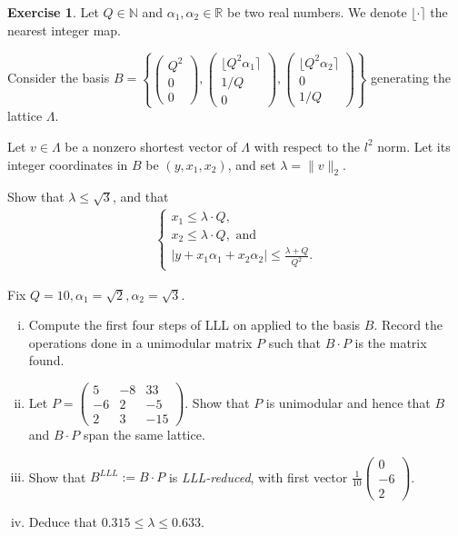 \documentclass[12pt,a4paper]{article}
\theoremstyle{plain}
\newtheorem*{Sol*}{Solution}
\theoremstyle{definition}
\newtheorem{Ex}{Exercise}
\def \N {\mathbb N}
\def \R {\mathbb R}
\newcommand{\nint}[1]{\ensuremath{\lfloor#1\rceil}}
\newif\ifsolutions
\newcommand{\exercise}[2]{
			\begin{Ex} #1 \end{Ex}
			\ifsolutions  \begin{Sol*} #2 \end{Sol*} \bigskip \else \bigskip  \fi
		}
\begin{document}
\exercise{
	Let $Q \in \N$ and $\alpha_1, \alpha_2 \in \R$ be two real numbers. We denote $\nint{ \cdot }$ the nearest integer map.

	Consider the basis $B = \left\{ \begin{pmatrix} Q^2 \\ 0 \\ 0 \end{pmatrix}, \begin{pmatrix} \nint{Q^2 \alpha_1} \\ 1/Q \\ 0 \end{pmatrix}, \begin{pmatrix} \nint{Q^2 \alpha_2} \\ 0 \\ 1/Q \end{pmatrix} \right\}$ generating the lattice $\Lambda$.
	
	Let  $v \in \Lambda$ be a nonzero shortest vector of $\Lambda$ with respect to the $l^2$ norm. 
	Let its integer coordinates in $B$ be $(y, x_1, x_2)$, and set $\lambda = \| v \|_2$.

	Show that $\lambda \leq \sqrt{3}$, and that
	\begin{align*}
	\begin{cases}
		x_1 \leq \lambda \cdot Q, \\
		x_2 \leq \lambda \cdot Q,  \text{ and }\\
		| y + x_1 \alpha_1 + x_2 \alpha_2 | \leq \frac{\lambda + Q}{Q^2}.
	\end{cases}
	\end{align*}
	
	Fix $Q=10, \alpha_1 = \sqrt{2}, \alpha_2 = \sqrt{3}$.
	\begin{enumerate}[i)]
		\item Compute the first four steps of LLL on applied to the basis $B$. 
		Record the operations done in a unimodular matrix $P$ such that $B \cdot P$ is the matrix found.
		\item Let $P = \begin{pmatrix} 5 & -8 & 33 \\
								-6 & 2 & -5 \\
								2 & 3 & -15 \end{pmatrix}.$
		Show that $P$ is unimodular and hence that $B$ and $B \cdot P$ span the same lattice.
		\item Show that $B^{LLL} := B \cdot P$ is \emph{LLL-reduced}, with first vector $\frac{1}{10}\begin{pmatrix} 0 \\ -6 \\ 2 \end{pmatrix}$.
		\item Deduce that $0.315 \leq \lambda \leq 0.633$.
	\end{enumerate}
}
{}
\end{document}
